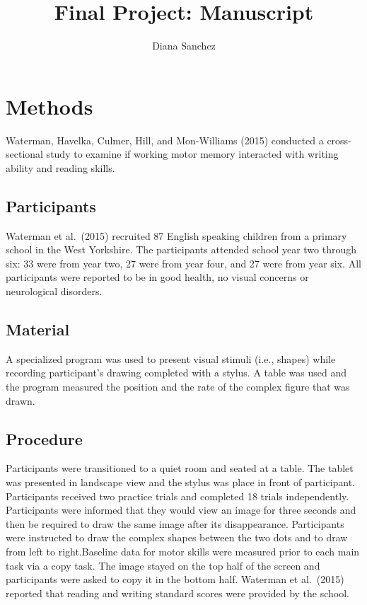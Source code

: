\documentclass[
  english,
  man]{apa6}
\title{Final Project: Manuscript}
\author{Diana Sanchez\textsuperscript{}}
\date{}
\affiliation{\phantom{0}}
\begin{document}
\maketitle

\hypertarget{methods}{%
\section{Methods}\label{methods}}

Waterman, Havelka, Culmer, Hill, and Mon-Williams (2015) conducted a cross-sectional study to examine if working motor memory interacted with writing ability and reading skills.

\hypertarget{participants}{%
\subsection{Participants}\label{participants}}

Waterman et al.~(2015) recruited 87 English speaking children from a primary school in the West Yorkshire. The participants attended school year two through six: 33 were from year two, 27 were from year four, and 27 were from year six. All participants were reported to be in good health, no visual concerns or neurological disorders.

\hypertarget{material}{%
\subsection{Material}\label{material}}

A specialized program was used to present visual stimuli (i.e., shapes) while recording participant's drawing completed with a stylus. A table was used and the program measured the position and the rate of the complex figure that was drawn.

\hypertarget{procedure}{%
\subsection{Procedure}\label{procedure}}

Participants were transitioned to a quiet room and seated at a table. The tablet was presented in landscape view and the stylus was place in front of participant. Participants received two practice trials and completed 18 trials independently. Participants were informed that they would view an image for three seconds and then be required to draw the same image after its disappearance. Participants were instructed to draw the complex shapes between the two dots and to draw from left to right.Baseline data for motor skills were measured prior to each main task via a copy task. The image stayed on the top half of the screen and participants were asked to copy it in the bottom half. Waterman et al.~(2015) reported that reading and writing standard scores were provided by the school.
\end{document}
